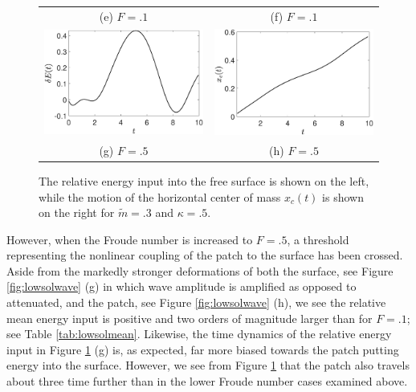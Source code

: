 \documentclass[a4paper,11pt]{article}
\begin{document}
\begin{figure}
\begin{tabular}{cc}
(e) $F=.1$ & (f) $F=.1$\\
 \includegraphics[width=.35\textwidth]{energy_wm_50_modu_pt3} & \includegraphics[width=.35\textwidth]{com_wm_50_modu_pt3}\\
(g) $F=.5$ & (h) $F=.5$
\end{tabular}
\caption{The relative energy input into the free surface is shown on the left, while the motion of the horizontal center of mass $x_{c}(t)$ is shown on the right for $\tilde{m}=.3$ and $\kappa = .5$.}
\label{fig:lowsolvorticity}
\end{figure}

However, when the Froude number is increased to $F=.5$, a threshold representing the nonlinear coupling of the patch to the surface has been crossed.  Aside from the markedly stronger deformations of both the surface, see Figure \ref{fig:lowsolwave} (g) in which wave amplitude is amplified as opposed to attenuated, and the patch, see Figure \ref{fig:lowsolwave} (h), we see the relative mean energy input is positive and two orders of magnitude larger than for $F=.1$; see Table \ref{tab:lowsolmean}.  Likewise, the time dynamics of the relative energy input in Figure \ref{fig:lowsolvorticity} (g) is, as expected, far more biased towards the patch putting energy into the surface.  However, we see from Figure \ref{fig:lowsolvorticity} that the patch also travels about three time further than in the lower Froude number cases examined above.  
\end{document}
